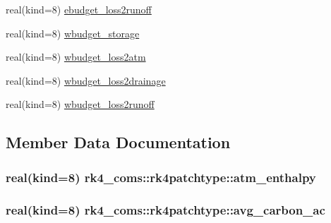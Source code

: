 \begin{DoxyCompactItemize}
real(kind=8) \hyperlink{structrk4__coms_1_1rk4patchtype_a8fc0d8ee10c1514c9ec0f1170dedab04}{ebudget\+\_\+loss2runoff}
\item 
real(kind=8) \hyperlink{structrk4__coms_1_1rk4patchtype_a8353e7ef490e77bb14d49b4c6151e1d9}{wbudget\+\_\+storage}
\item 
real(kind=8) \hyperlink{structrk4__coms_1_1rk4patchtype_a1ac1fd5a180e1c1b79dbce1f2bb6fe8b}{wbudget\+\_\+loss2atm}
\item 
real(kind=8) \hyperlink{structrk4__coms_1_1rk4patchtype_a75224b0fce27f5ff820fc0b2b55cb8fc}{wbudget\+\_\+loss2drainage}
\item 
real(kind=8) \hyperlink{structrk4__coms_1_1rk4patchtype_aa85e77ba1392352ea0c61466b5d6b542}{wbudget\+\_\+loss2runoff}
\end{DoxyCompactItemize}


\subsection{Member Data Documentation}
\hypertarget{structrk4__coms_1_1rk4patchtype_a79ae2ab2774fdd900ec72046deff600b}{}
\subsubsection[{atm\+\_\+enthalpy}]{\setlength{\rightskip}{0pt plus 5cm}real(kind=8) rk4\+\_\+coms\+::rk4patchtype\+::atm\+\_\+enthalpy}\label{structrk4__coms_1_1rk4patchtype_a79ae2ab2774fdd900ec72046deff600b}
\hypertarget{structrk4__coms_1_1rk4patchtype_ad6e6550176dfb89feebfd941165e2449}{}
\subsubsection[{avg\+\_\+carbon\+\_\+ac}]{\setlength{\rightskip}{0pt plus 5cm}real(kind=8) rk4\+\_\+coms\+::rk4patchtype\+::avg\+\_\+carbon\+\_\+ac}\label{structrk4__coms_1_1rk4patchtype_ad6e6550176dfb89feebfd941165e2449}
\hypertarget{structrk4__coms_1_1rk4patchtype_a410ab0421800f82d20802b590159b4d2}{}
